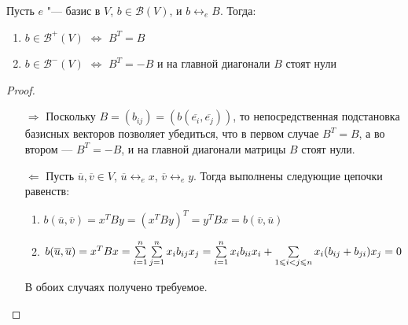 \begin{proposition}
	Пусть $e$ "--- базис в $V$, $b \in \mathcal{B}(V)$, и $b \leftrightarrow_e B$. Тогда:
	\begin{enumerate}
		\item $b \in \mathcal{B}^+(V)$ $\Leftrightarrow$ $B^T = B$
		\item $b \in \mathcal{B}^-(V)$ $\Leftrightarrow$ $B^T = -B$ и на главной диагонали $B$ стоят нули
	\end{enumerate}
\end{proposition}

\begin{proof}~
	\begin{itemize}
		\item[$\Rightarrow$] Поскольку $B = (b_{ij}) = (b(\overline{e_i}, \overline{e_j}))$, то непосредственная подстановка базисных векторов позволяет убедиться, что в первом случае $B^T = B$, а во втором --- $B^T = -B$, и на главной диагонали матрицы $B$ стоят нули.
		
		\item[$\Leftarrow$] Пусть $\overline{u}, \overline{v} \in V$, $\overline{u} \leftrightarrow_e x$, $\overline{v} \leftrightarrow_e y$. Тогда выполнены следующие цепочки равенств:
		\begin{enumerate}
			\item $b(\overline{u}, \overline{v}) = x^TBy = (x^TBy)^T = y^TBx = b(\overline{v}, \overline{u})$
   
			\item $b(\overline{u}, \overline{u}) = x^TBx \hm{=} \sum\limits_{i = 1}^n\sum\limits_{j = 1}^nx_ib_{ij}x_j \hm= \sum\limits_{i = 1}^nx_ib_{ii}x_i + \sum\limits_{1 \le i < j \le n}x_i(b_{ij} + b_{ji})x_j = 0$
		\end{enumerate}

		В обоих случаях получено требуемое.\qedhere
	\end{itemize}
\end{proof}